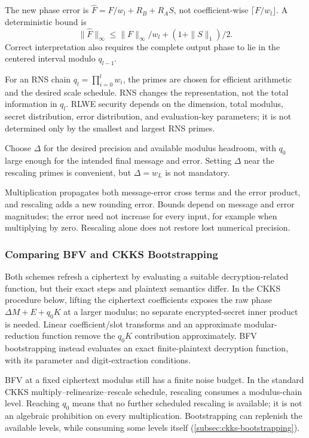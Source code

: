 The new phase error is $\widehat F=F/w_l+R_B+R_AS$, not coefficient-wise $\lceil F/w_l\rfloor$. A deterministic bound is
\[
\|\widehat F\|_\infty\leq\|F\|_\infty/w_l+(1+\|S\|_1)/2.
\]
Correct interpretation also requires the complete output phase to lie in the centered interval modulo $q_{l-1}$.

For an RNS chain $q_l=\prod_{i=0}^l w_i$, the primes are chosen for efficient arithmetic and the desired scale schedule. RNS changes the representation, not the total information in $q_l$. RLWE security depends on the dimension, total modulus, secret distribution, error distribution, and evaluation-key parameters; it is not determined only by the smallest and largest RNS primes.

 Choose $\Delta$ for the desired precision and available modulus headroom, with $q_0$ large enough for the intended final message and error. Setting $\Delta$ near the rescaling primes is convenient, but $\Delta=w_L$ is not mandatory.

 Multiplication propagates both message-error cross terms and the error product, and rescaling adds a new rounding error. Bounds depend on message and error magnitudes; the error need not increase for every input, for example when multiplying by zero. Rescaling alone does not restore lost numerical precision.

\subsubsection{Comparing BFV and CKKS Bootstrapping}
\label{subsubsec:bfv-bootstrapping-ckks-comparison}

Both schemes refresh a ciphertext by evaluating a suitable decryption-related function, but their exact steps and plaintext semantics differ. In the CKKS procedure below, lifting the ciphertext coefficients exposes the raw phase $\Delta M+E+q_0K$ at a larger modulus; no separate encrypted-secret inner product is needed. Linear coefficient/slot transforms and an approximate modular-reduction function remove the $q_0K$ contribution approximately. BFV bootstrapping instead evaluates an exact finite-plaintext decryption function, with its parameter and digit-extraction conditions.

 BFV at a fixed ciphertext modulus still has a finite noise budget. In the standard CKKS multiply--relinearize--rescale schedule, rescaling consumes a modulus-chain level. Reaching $q_0$ means that no further scheduled rescaling is available; it is not an algebraic prohibition on every multiplication. Bootstrapping can replenish the available levels, while consuming some levels itself (\autoref{subsec:ckks-bootstrapping}).

